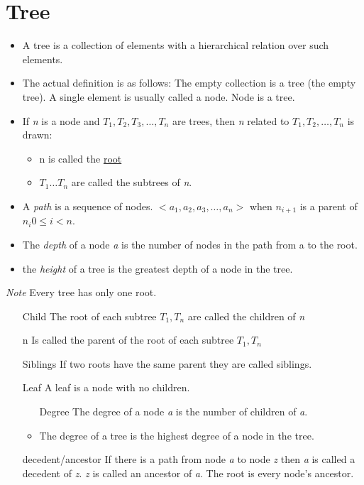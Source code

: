\documentclass{article}
\begin{document}
\section{Tree}
\begin{itemize}
\item A tree is a collection of elements with a hierarchical relation over such elements.
\item The actual definition is as follows: The empty collection is a tree (the empty tree). A single element is usually called a node. Node is a tree.
\item If \textit{n} is a node and $T_1, T_2, T_3, \ldots , T_n$ are trees, then \textit{n} related to $T_1, T_2, \ldots, T_n$ is drawn:
\begin{itemize}
    \item n is called the \underline{root}
    \item $T_1 \ldots T_n$ are called the subtrees of \textit{n}.
\end{itemize}
\item A \textit{path} is a sequence of nodes. $<a_1, a_2, a_3, \ldots, a_n>$ when $n_{i+1}$ is a parent of $n_i 0 \leq i < n$.
\item The \textit{depth} of a node \textit{a} is the number of nodes in the path from a to the root.
\item the \textit{height} of a tree is the greatest depth of a node in the tree.
\end{itemize}

\textit{Note} Every tree has only one root.

\begin{itemize}
\item[Child] The root of each subtree $T_1, T_n$ are called the children of \textit{n}
\item[n] Is called the parent of the root of each subtree $T_1, T_n$
\item[Siblings] If two roots have the same parent they are called siblings.
\item[Leaf] A leaf is a node with no children.
\begin{itemize}
    \item[Degree] The degree of a node \textit{a} is the number of children of \textit{a}.
    \item The degree of a tree is the highest degree of a node in the tree.
\end{itemize}
\item[decedent/ancestor] If there is a path from node \textit{a} to node \textit{z} then \textit{a} is called a decedent of \textit{z}. \textit{z} is called an ancestor of \textit{a}. The root is every node's ancestor.
\end{itemize}
\end{document}
